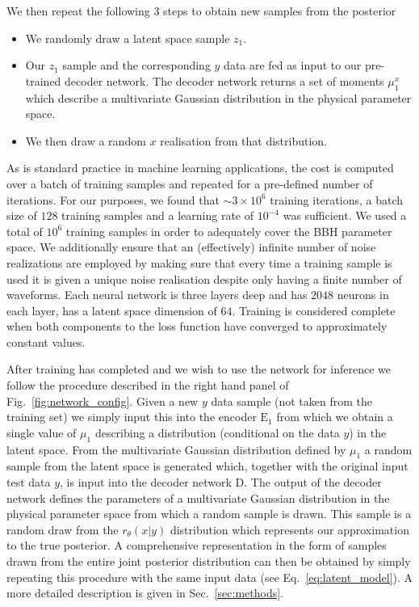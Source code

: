 \documentclass[%
showpacs,
 amsmath,amssymb,
 aps,
 twocolumn,
 prl,
 reprint,
floatfix,
]{revtex4-1}
\newcommand{\chris}[1]{\textbf{\textcolor{red}{CHRIS: #1}}}
\begin{document}
We then repeat the following 3 steps to
obtain new samples from the posterior

%
\begin{itemize}
%
\item We randomly draw a latent space sample $z_1$.
%
\item Our $z_1$ sample and the corresponding $y$ data are fed as input to our
pre-trained decoder network. The decoder network returns a set of moments
$\mu^{x}_1$ which describe a multivariate Gaussian distribution in the physical
parameter space.
%
\item We then draw a random $x$ realisation from that distribution.
%
\end{itemize}
%

%
%
As is standard practice in machine learning applications, the cost
is computed over a batch of training samples and repeated for a pre-defined
number of iterations. For our purposes, we found that $\sim3\times10^6$
training iterations, a batch size of $128$ training samples and a learning rate
of $10^{-4}$ was sufficient.  We used a total of $10^6$ training samples in
order to adequately cover the \ac{BBH} parameter space.  We additionally ensure
that an (effectively) infinite number of noise realizations are employed by
making sure that every time a training sample is used it is given a unique
noise realisation despite only having a finite number of waveforms. Each neural
network is three layers deep and has $2048$ neurons in each layer, has a latent
space dimension of $64$.  Training is considered complete when both components
to the loss function have converged to approximately constant values.

%
%
After training has completed and we wish to use the network for inference we
follow the procedure described in the right hand panel of
Fig.~\ref{fig:network_config}. Given a new $y$ data sample (not taken from the
training set) we simply input this into the encoder $\textrm{E}_1$ from which we
obtain a single value of $\mu_{1}$ describing a distribution (conditional on the
data $y$) in the latent space. From the multivariate Gaussian distribution
defined by $\mu_{1}$ a random sample from the latent space is generated which,
together with the original input test data $y$, is input into the decoder
network D. The output of the decoder network defines the parameters of a
multivariate Gaussian distribution in the physical parameter space from which a
random sample is drawn. This sample is a random draw from the $r_{\theta}(x|y)$
distribution which represents our approximation to the true posterior. A
comprehensive representation in the form of samples drawn from the entire joint
posterior distribution can then be obtained by simply repeating this procedure
with the same input data (see Eq.~\ref{eq:latent_model}). A more detailed
description is given in Sec.~\ref{sec:methods}.


\end{document}
